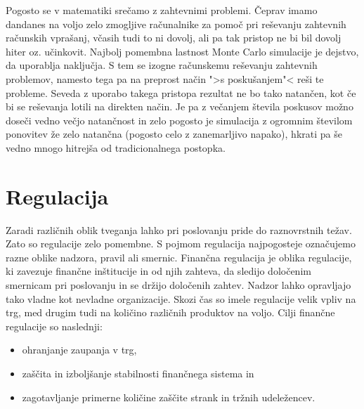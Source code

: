 \documentclass[12pt,a4paper]{amsart}
\theoremstyle{definition} %
\theoremstyle{plain} %
\begin{document}
Pogosto se v matematiki srečamo z zahtevnimi problemi. Čeprav imamo dandanes
na voljo zelo zmogljive računalnike za pomoč pri reševanju zahtevnih računskih
vprašanj, včasih tudi to ni dovolj, ali pa tak pristop ne bi bil dovolj hiter oz.
učinkovit. Najbolj pomembna lastnost Monte Carlo simulacije je dejstvo, da 
uporablja naključja. S tem se izogne računskemu reševanju zahtevnih problemov,
namesto tega pa na preprost način ">s poskušanjem"< reši te probleme. 
Seveda z uporabo takega pristopa rezultat ne bo tako natančen, kot če bi
se reševanja lotili na direkten način. Je pa z večanjem števila poskusov možno
doseči vedno večjo natančnost in zelo pogosto je simulacija z ogromnim 
številom ponovitev že zelo natančna (pogosto celo z zanemarljivo napako), 
hkrati pa še vedno mnogo hitrejša od tradicionalnega postopka.


\section{Regulacija}
Zaradi različnih oblik tveganja lahko pri poslovanju pride do raznovrstnih težav. 
Zato so regulacije zelo pomembne. S pojmom regulacija najpogosteje označujemo
razne oblike nadzora, pravil ali smernic. Finančna regulacija je oblika 
regulacije, ki zavezuje finančne inštitucije in od njih zahteva, da sledijo določenim
smernicam pri poslovanju in se držijo določenih zahtev. Nadzor lahko opravljajo 
tako vladne kot nevladne organizacije. Skozi čas so imele regulacije velik vpliv na 
trg, med drugim tudi na količino različnih produktov na voljo. Cilji finančne 
regulacije so naslednji:
\begin{itemize}
  \item ohranjanje zaupanja v trg,
  \item zaščita in izboljšanje stabilnosti finančnega sistema in
  \item zagotavljanje primerne količine zaščite strank in tržnih udeležencev.
\end{itemize}
\end{document}
